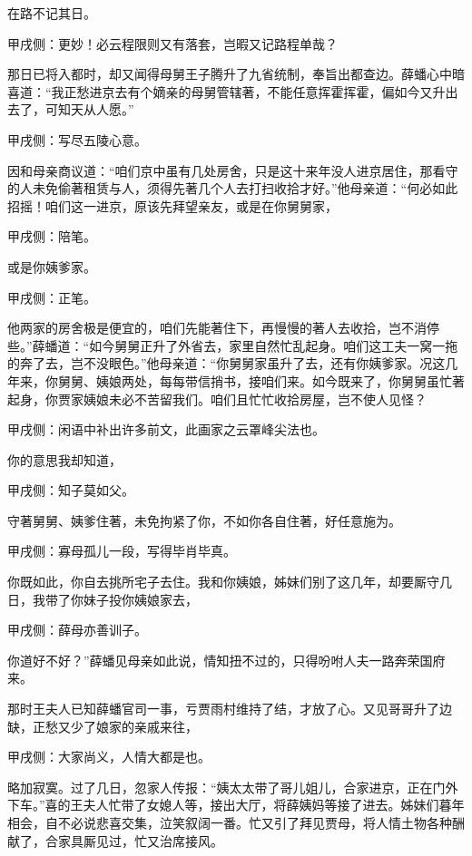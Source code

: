 \begin{parag}
    在路不记其日。\begin{note}甲戌侧：更妙！必云程限则又有落套，岂暇又记路程单哉？\end{note}那日已将入都时，却又闻得母舅王子腾升了九省统制，奉旨出都查边。薛蟠心中暗喜道：“我正愁进京去有个嫡亲的母舅管辖著，不能任意挥霍挥霍，偏如今又升出去了，可知天从人愿。”\begin{note}甲戌侧：写尽五陵心意。\end{note}因和母亲商议道：“咱们京中虽有几处房舍，只是这十来年没人进京居住，那看守的人未免偷著租赁与人，须得先著几个人去打扫收拾才好。”他母亲道：“何必如此招摇！咱们这一进京，原该先拜望亲友，或是在你舅舅家，\begin{note}甲戌侧：陪笔。\end{note}或是你姨爹家。\begin{note}甲戌侧：正笔。\end{note}他两家的房舍极是便宜的，咱们先能著住下，再慢慢的著人去收拾，岂不消停些。”薛蟠道：“如今舅舅正升了外省去，家里自然忙乱起身。咱们这工夫一窝一拖的奔了去，岂不没眼色。”他母亲道：“你舅舅家虽升了去，还有你姨爹家。况这几年来，你舅舅、姨娘两处，每每带信捎书，接咱们来。如今既来了，你舅舅虽忙著起身，你贾家姨娘未必不苦留我们。咱们且忙忙收拾房屋，岂不使人见怪？\begin{note}甲戌侧：闲语中补出许多前文，此画家之云罩峰尖法也。\end{note}你的意思我却知道，\begin{note}甲戌侧：知子莫如父。\end{note}守著舅舅、姨爹住著，未免拘紧了你，不如你各自住著，好任意施为。\begin{note}甲戌侧：寡母孤儿一段，写得毕肖毕真。\end{note}你既如此，你自去挑所宅子去住。我和你姨娘，姊妹们别了这几年，却要厮守几日，我带了你妹子投你姨娘家去，\begin{note}甲戌侧：薛母亦善训子。\end{note}你道好不好？”薛蟠见母亲如此说，情知扭不过的，只得吩咐人夫一路奔荣国府来。
\end{parag}


\begin{parag}
    那时王夫人已知薛蟠官司一事，亏贾雨村维持了结，才放了心。又见哥哥升了边缺，正愁又少了娘家的亲戚来往，\begin{note}甲戌侧：大家尚义，人情大都是也。\end{note}略加寂寞。过了几日，忽家人传报：“姨太太带了哥儿姐儿，合家进京，正在门外下车。”喜的王夫人忙带了女媳人等，接出大厅，将薛姨妈等接了进去。姊妹们暮年相会，自不必说悲喜交集，泣笑叙阔一番。忙又引了拜见贾母，将人情土物各种酬献了，合家具厮见过，忙又治席接风。
\end{parag}


